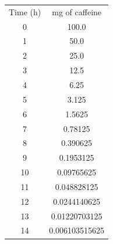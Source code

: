 \documentclass[12pt]{article}
\begin{document}
                \begin{center}
                        \begin{tabular}{cc}
                        Time (h) & mg of caffeine \\
                        0 & 100.0 \\ 
                        1 & 50.0 \\ 
                        2 & 25.0 \\
                        3 & 12.5 \\ 
                        4 & 6.25 \\ 
                        5 & 3.125 \\ 
                        6 & 1.5625 \\
                        7 & 0.78125 \\
                        8 & 0.390625 \\
                        9 & 0.1953125 \\ 
                        10 & 0.09765625 \\ 
                        11 & 0.048828125 \\ 
                        12 & 0.0244140625 \\ 
                        13 & 0.01220703125 \\
                        14 & 0.006103515625 \\
                        
                                           
                        \end{tabular}
                        
                \end{center}
                

        
\end{document}
